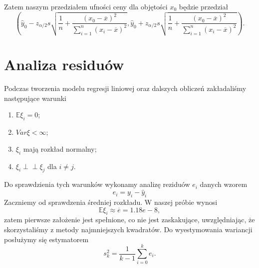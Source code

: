 \documentclass[12pt,leqno]{article}
\theoremstyle{exer}
\begin{document}
	Zatem naszym przedziałem ufności ceny dla objętości $x_0$ będzie przedział
	\begin{equation}
		\left(\hat y_0 - 	z_{\alpha/2}s\sqrt{\frac{1}{n}+\frac{\left(x_0-\overline{x}\right)^2}{\sum_{i=1}^n\left(x_i-\overline{x}\right)^2}}, \hat y_0 + z_{\alpha/2}s\sqrt{\frac{1}{n}+\frac{\left(x_0-\overline{x}\right)^2}{\sum_{i=1}^n\left(x_i-\overline{x}\right)^2}}\right).
	\end{equation}



 \section{Analiza residuów}
 	Podczas tworzenia modelu regresji liniowej oraz dalszych obliczeń zakładaliśmy następujące warunki
 	\begin{enumerate}
 		\item $\mathbb{E}\xi_i=0$;
 		\item $Var\xi<\infty$;
 		\item $\xi_i$ mają rozkład normalny;
 		\item $\xi_i\perp\!\!\!\perp\xi_j$ dla $i\neq j$.
 	\end{enumerate}
 	Do sprawdzienia tych warunków wykonamy analizę reziduów $e_i$ danych wzorem
 	\begin{equation}
 		e_i=y_i-\hat y_i
 	\end{equation}
    Zaczniemy od sprawdzenia średniej rozkładu. W naszej próbie wynosi
	\begin{equation}
		\mathbb{E}\xi_i\approx\overline{e}=1.18e-8,
	\end{equation}
	zatem pierwsze założenie jest spełnione, co nie jest zaskakujące, uwzględniając, że skorzystaliśmy z metody najmniejszych kwadratów. Do wyestymowania wariancji posłużymy się estymatorem
	\begin{equation}
		s^2_k=\frac{1}{k-1}\sum\limits_{i=0}^k e_i.
	\end{equation}
\end{document}
